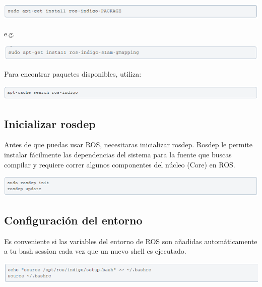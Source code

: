 \documentclass[user_manual.tex]{subfiles}
\begin{document}
\begin{center}
\includegraphics[width=1\textwidth]{Figures/Software/Install_ROS/Paso_10.png}
\end{center}

e.g.

\begin{center}
\includegraphics[width=1\textwidth]{Figures/Software/Install_ROS/Paso_11.png}
\end{center}

Para encontrar paquetes disponibles, utiliza:

\begin{center}
\includegraphics[width=1\textwidth]{Figures/Software/Install_ROS/Paso_12.png}
\end{center}

\subsection{Inicializar rosdep}
Antes de que puedas usar ROS, necesitaras inicializar rosdep. Rosdep le permite instalar fácilmente las dependencias 
del sistema para la fuente que buscas compilar y requiere correr algunos componentes del núcleo (Core) en ROS.

\begin{center}
\includegraphics[width=1\textwidth]{Figures/Software/Install_ROS/Paso_13.png}
\end{center}

\subsection{Configuración del entorno}

Es conveniente si las variables del entorno de ROS son añadidas automáticamente a tu bash session cada vez que un 
nuevo shell es ejecutado. 

\begin{center}
\includegraphics[width=1\textwidth]{Figures/Software/Install_ROS/Paso_14.png}
\end{center}
\end{document}
